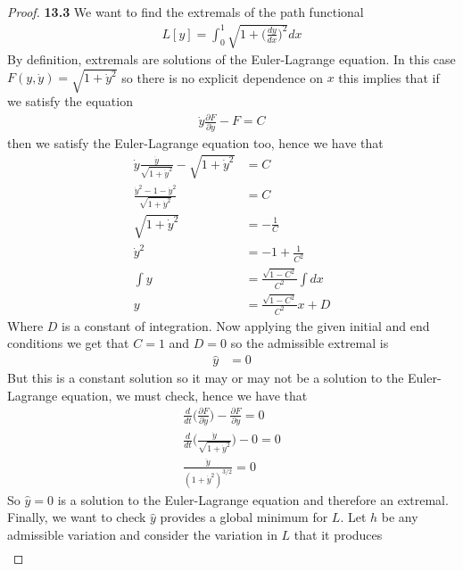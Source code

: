 \documentclass[11pt]{article}
\theoremstyle{definition}
\begin{document}
\begin{proof}{\textbf{13.3}}
    We want to find the extremals of the path functional
    \begin{align*}
        L[y] = \int_0^1 \sqrt{1 + \bigg(\frac{dy}{dx}\bigg)^2} dx
    \end{align*}
    By definition, extremals are solutions of the Euler-Lagrange equation.
    In this case $F(y,\dot{y}) = \sqrt{1 + \dot{y}^2}$ so there is no explicit
    dependence on $x$ this implies that if we satisfy the equation
    \begin{align*}
        \dot{y}\frac{\partial F}{\partial\dot{y}} - F = C
    \end{align*}
    then we satisfy the Euler-Lagrange equation too, hence we have that
    \begin{align*}
        \dot{y}\frac{\dot{y}}{\sqrt{1 + \dot{y}^2}} - \sqrt{1 + \dot{y}^2} &= C\\
        \frac{\dot{y}^2 - 1 - \dot{y}^2}{\sqrt{1 + \dot{y}^2}} &= C\\
        \sqrt{1 + \dot{y}^2} &= -\frac{1}{C}\\
        \dot{y}^2 &= -1 + \frac{1}{C^2}\\
        \int y &= \frac{\sqrt{1-C^2}}{C^2} \int dx\\
        y &= \frac{\sqrt{1-C^2}}{C^2} x + D
    \end{align*}
    Where $D$ is a constant of integration. Now applying the given
    initial and end conditions we get that $C = 1$ and $D = 0$ so 
    the admissible extremal is
    \begin{align*}
        \hat y &= 0        
    \end{align*}
    But this is a constant solution so it may or may not be a solution to the
    Euler-Lagrange equation, we must check, hence we have that
    \begin{align*}
        \frac{d}{dt}\bigg(\frac{\partial F}{\partial \dot y}\bigg) - \frac{\partial F}{\partial y} = 0\\
        \frac{d}{dt}\bigg(\frac{\dot{y}}{\sqrt{1 + \dot{y}^2}}\bigg) - 0 = 0\\
        \frac{\ddot{y}}{(1 + \dot{y}^2)^{3/2}} = 0
    \end{align*}
    So $\hat y = 0$ is a solution to the Euler-Lagrange equation and therefore
    an extremal.
\cleardoublepage
    Finally, we want to check $\hat y$ provides a global minimum for $L$.
    Let $h$ be any admissible variation and consider the variation in $L$
    that it produces
    \begin{align*}

\end{align*}
\end{proof}
\end{document}
